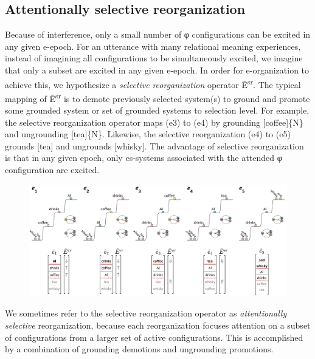 \subsection{Attentionally selective reorganization}

Because of interference, only a small number of φ configurations can be excited in any given e-epoch. For an utterance with many relational meaning experiences, instead of imagining all configurations to be simultaneously excited, we imagine that only a subset are excited in any given e-epoch. In order for e-organization to achieve this, we hypothesize a \textit{selective} \textit{reorganization} operator Ê\textsuperscript{sr}. The typical mapping of  Ê\textsuperscript{sr} is to demote previously selected system(s) to ground and promote some grounded system or set of grounded systems to selection level. For example, the selective reorganization operator maps (e3) to (e4) by grounding [coffee]\{N\} and ungrounding [tea]\{N\}. Likewise, the selective reorganization (e4) to (e5) grounds [tea] and ungrounds [whisky]. The advantage of selective reorganization is that in any given epoch, only cs-systems associated with the attended φ configuration are excited.

  
\begin{figure}
\includegraphics[width=\textwidth]{figures/Tilsen-img99.png}
\caption{\missingcaption}
\label{fig:}
\end{figure}
   

  We sometimes refer to the selective reorganization operator as \textit{attentionally} \textit{selective} reorganization, because each reorganization focuses attention on a subset of configurations from a larger set of active configurations. This is accomplished by a combination of grounding demotions and ungrounding promotions.

